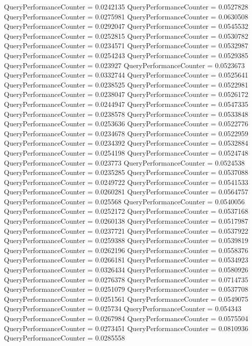 \documentclass[9pt]{article}
\theoremstyle{plain}
\theoremstyle{definition}
\theoremstyle{remark}
\numberwithin{equation}{section}
\begin{document}
QueryPerformanceCounter  =  0.0242135
QueryPerformanceCounter  =  0.0527828
QueryPerformanceCounter  =  0.0275981
QueryPerformanceCounter  =  0.0630508
QueryPerformanceCounter  =  0.0292047
QueryPerformanceCounter  =  0.0545532
QueryPerformanceCounter  =  0.0252815
QueryPerformanceCounter  =  0.0530782
QueryPerformanceCounter  =  0.0234571
QueryPerformanceCounter  =  0.0532987
QueryPerformanceCounter  =  0.0254243
QueryPerformanceCounter  =  0.0529385
QueryPerformanceCounter  =  0.023927
QueryPerformanceCounter  =  0.0523673
QueryPerformanceCounter  =  0.0332744
QueryPerformanceCounter  =  0.0525641
QueryPerformanceCounter  =  0.0238525
QueryPerformanceCounter  =  0.0522981
QueryPerformanceCounter  =  0.0238047
QueryPerformanceCounter  =  0.0526172
QueryPerformanceCounter  =  0.0244947
QueryPerformanceCounter  =  0.0547335
QueryPerformanceCounter  =  0.0238578
QueryPerformanceCounter  =  0.0533848
QueryPerformanceCounter  =  0.0253636
QueryPerformanceCounter  =  0.0522776
QueryPerformanceCounter  =  0.0234678
QueryPerformanceCounter  =  0.0522959
QueryPerformanceCounter  =  0.0234392
QueryPerformanceCounter  =  0.0532884
QueryPerformanceCounter  =  0.0254198
QueryPerformanceCounter  =  0.0524748
QueryPerformanceCounter  =  0.023773
QueryPerformanceCounter  =  0.0524538
QueryPerformanceCounter  =  0.0235285
QueryPerformanceCounter  =  0.0537088
QueryPerformanceCounter  =  0.0249722
QueryPerformanceCounter  =  0.0541533
QueryPerformanceCounter  =  0.0260281
QueryPerformanceCounter  =  0.0564757
QueryPerformanceCounter  =  0.025568
QueryPerformanceCounter  =  0.0540056
QueryPerformanceCounter  =  0.0252172
QueryPerformanceCounter  =  0.0537168
QueryPerformanceCounter  =  0.0260138
QueryPerformanceCounter  =  0.0517987
QueryPerformanceCounter  =  0.0237721
QueryPerformanceCounter  =  0.0537922
QueryPerformanceCounter  =  0.0259388
QueryPerformanceCounter  =  0.0539819
QueryPerformanceCounter  =  0.0262196
QueryPerformanceCounter  =  0.0558376
QueryPerformanceCounter  =  0.0266181
QueryPerformanceCounter  =  0.0534923
QueryPerformanceCounter  =  0.0326434
QueryPerformanceCounter  =  0.0580926
QueryPerformanceCounter  =  0.0276378
QueryPerformanceCounter  =  0.0714735
QueryPerformanceCounter  =  0.0251079
QueryPerformanceCounter  =  0.0537708
QueryPerformanceCounter  =  0.0251561
QueryPerformanceCounter  =  0.0549075
QueryPerformanceCounter  =  0.025734
QueryPerformanceCounter  =  0.054343
QueryPerformanceCounter  =  0.0267984
QueryPerformanceCounter  =  0.0575504
QueryPerformanceCounter  =  0.0273451
QueryPerformanceCounter  =  0.0810936
QueryPerformanceCounter  =  0.0285558
\end{document}
